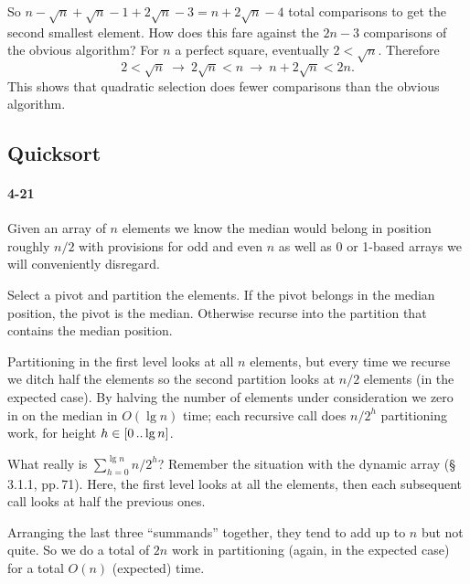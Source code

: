 \documentclass{report}
\newcommand{\ldotsTwo}{%
  \mathinner{{\ldotp}{\ldotp}}%
}
\begin{document}
So $n-\sqrt{n} + \sqrt{n}-1 + 2\sqrt{n}-3 = n + 2\sqrt{n} - 4$ total comparisons to get the second smallest element. How does this fare against the $2n-3$ comparisons of the obvious algorithm? For $n$ a perfect square, eventually $2 < \sqrt{n}$. Therefore
\begin{equation*}
	2 < \sqrt{n} \ \rightarrow\ 2\sqrt{n} < n \ \rightarrow\ n + 2\sqrt{n} < 2n.
\end{equation*}
This shows that quadratic selection does fewer comparisons than the obvious algorithm.

\subsection*{Quicksort}

\paragraph{4-21} Given an array of $n$ elements we know the median would belong in position roughly $n/2$ with provisions for odd and even $n$ as well as 0 or 1-based arrays we will conveniently disregard.

Select a pivot and partition the elements. If the pivot belongs in the median position, the pivot is the median. Otherwise recurse into the partition that contains the median position.

\medskip

Partitioning in the first level looks at all $n$ elements, but every time we recurse we ditch half the elements so the second partition looks at $n/2$ elements (in the expected case). By halving the number of elements under consideration we zero in on the median in $O(\lg n)$ time; each recursive call does $n/2^h$ partitioning work, for height $h\in [0\ldotsTwo\lg n]$.

What really is $\sum_{h=0}^{\lg n} n/2^h$? Remember the situation with the dynamic array (\S\,3.1.1, pp.\,71). Here, the first level looks at all the elements, then each subsequent call looks at half the previous ones.
\begin{center}
\end{center}
Arranging the last three ``summands'' together, they tend to add up to $n$ but not quite. So we do a total of $2n$ work in partitioning (again, in the expected case) for a total $O(n)$ (expected) time.
\end{document}
